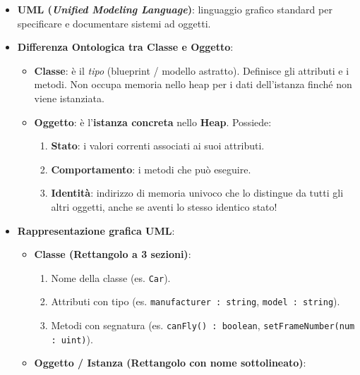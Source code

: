 \documentclass[11pt,a4paper]{article}
\newcommand{\passthrough}[1]{#1}
\providecommand{\tightlist}{\setlength{\itemsep}{0pt}\setlength{\parskip}{0pt}}
\begin{document}
\begin{itemize}
\tightlist
\item
  \textbf{UML (\emph{Unified Modeling Language})}: linguaggio grafico
  standard per specificare e documentare sistemi ad oggetti.
\item
  \textbf{Differenza Ontologica tra Classe e Oggetto}:

  \begin{itemize}
  \tightlist
  \item
    \textbf{Classe}: è il \emph{tipo} (blueprint / modello astratto).
    Definisce gli attributi e i metodi. Non occupa memoria nello heap
    per i dati dell'istanza finché non viene istanziata.
  \item
    \textbf{Oggetto}: è l'\textbf{istanza concreta} nello \textbf{Heap}.
    Possiede:

    \begin{enumerate}
    \def\labelenumi{\arabic{enumi}.}
    \tightlist
    \item
      \textbf{Stato}: i valori correnti associati ai suoi attributi.
    \item
      \textbf{Comportamento}: i metodi che può eseguire.
    \item
      \textbf{Identità}: indirizzo di memoria univoco che lo distingue
      da tutti gli altri oggetti, anche se aventi lo stesso identico
      stato!
    \end{enumerate}
  \end{itemize}
\item
  \textbf{Rappresentazione grafica UML}:

  \begin{itemize}
  \tightlist
  \item
    \textbf{Classe (Rettangolo a 3 sezioni)}:

    \begin{enumerate}
    \def\labelenumi{\arabic{enumi}.}
    \tightlist
    \item
      Nome della classe (es. \passthrough{\lstinline!Car!}).
    \item
      Attributi con tipo (es.
      \passthrough{\lstinline!manufacturer : string!},
      \passthrough{\lstinline!model : string!}).
    \item
      Metodi con segnatura (es.
      \passthrough{\lstinline!canFly() : boolean!},
      \passthrough{\lstinline!setFrameNumber(num : uint)!}).
    \end{enumerate}
  \item
    \textbf{Oggetto / Istanza (Rettangolo con nome sottolineato)}:


\end{itemize}
\end{itemize}
\end{document}
